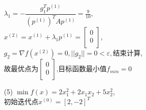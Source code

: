 \begin{solution}
    $\lambda_1=-\dfrac{g_1^Tp^{(1)}}{(p^{(1)})^TAp^{(1)}}=\frac{9}{10}$,\\
    $x^{(2)}=x^{(1)}+\lambda_1p^{(1)}=\begin{bmatrix} 0\\0\\\end{bmatrix}$,\\
    $g_2=\nabla f(x^{(2)})=0,||g_2||=0<\varepsilon,\text{结束计算}$,\\
    故最优点为$\begin{bmatrix} 0\\0\\\end{bmatrix}$,目标函数最小值$f_{min}=0$
\end{solution}

\begin{problem}{(5)}
    $\min f(x)=2x_1^2+2x_1x_2+5x_2^2$,\\
    初始迭代点${x^{(0)}}=[2,-2]^T$
\end{problem}
